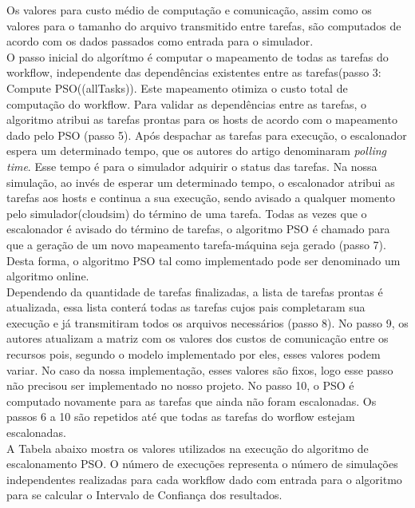 \documentclass[a4paper,10pt]{article}
\begin{document}
Os valores para custo médio de computação e comunicação, assim como os valores para o tamanho 
do arquivo transmitido entre tarefas, são computados de acordo com os dados passados como entrada para o simulador.\\

O passo inicial do algorítmo é computar o mapeamento de todas as tarefas do workflow, independente das dependências
existentes entre as tarefas(passo 3: Compute PSO((allTasks)). Este mapeamento otimiza o custo total de computação do workflow. 
Para validar as dependências entre as tarefas, o algoritmo atribui as tarefas prontas para os hosts de acordo com o 
mapeamento dado pelo PSO (passo 5). Após despachar as tarefas para execução, o escalonador espera um determinado tempo, que
os autores do artigo denominaram \emph{polling time}. Esse tempo é para o simulador adquirir o status das tarefas.
Na nossa simulação, ao invés de esperar um determinado tempo, o escalonador atribui as tarefas aos hosts e continua a sua execução, sendo
avisado a qualquer momento pelo simulador(cloudsim) do término de uma tarefa. Todas as vezes que o escalonador é avisado do término de tarefas, 
o algoritmo PSO é chamado para que a geração de um novo mapeamento tarefa-máquina seja gerado (passo 7). Desta forma, o algoritmo PSO tal como
implementado pode ser denominado um algoritmo online.\\

Dependendo da quantidade de tarefas finalizadas, a lista de tarefas prontas é atualizada, essa lista conterá todas as tarefas 
cujos pais completaram sua execução e já transmitiram todos os arquivos necessários (passo 8). No passo 9, os autores 
atualizam a matriz com os valores dos custos de comunicação entre os recursos pois, segundo o modelo implementado por eles, 
esses valores podem variar. No caso da nossa implementação, esses valores são fixos, logo esse passo não precisou ser implementado 
no nosso projeto. No passo 10, o PSO é computado novamente para as tarefas que ainda não foram escalonadas. Os passos 6 a 10 
são repetidos até que todas as tarefas do worflow estejam escalonadas.\\

A Tabela abaixo mostra os valores utilizados na execução do algoritmo de escalonamento PSO. O número de execuções representa o número de 
simulações independentes realizadas para cada workflow dado com entrada para o algoritmo para se calcular o Intervalo de Confiança dos resultados.\\
\end{document}
